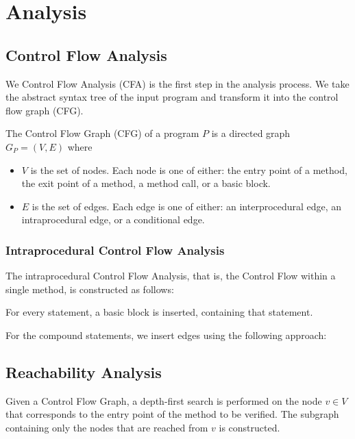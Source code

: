 \section{Analysis}

\subsection{Control Flow Analysis}
We Control Flow Analysis (CFA) is the first step in the analysis process. We 
take the abstract syntax tree of the input program and transform it into the 
control flow graph (CFG).

\begin{definition}
The Control Flow Graph (CFG) of a program $P$ is a directed graph $G_P=(V,E)$
where

\begin{itemize}
    \item $V$ is the set of nodes. Each node is one of either: the entry point 
    of a method, the exit point of a method, a method call, or a basic block.

    \item $E$ is the set of edges. Each edge is one of either: an interprocedural
    edge, an intraprocedural edge, or a conditional edge.
\end{itemize}
\end{definition}

\subsubsection{Intraprocedural Control Flow Analysis}
The intraprocedural Control Flow Analysis, that is, the Control Flow within a
single method, is constructed as follows:

For every statement, a basic block is inserted, containing that statement.

For the compound statements, we insert edges using the following approach:

\begin{description}
    \item[]
    \item[] 
    \item[] 
\end{description}


\subsection{Reachability Analysis}
Given a Control Flow Graph, a depth-first search is performed on the node $v \in V$ 
that corresponds to the entry point of the method to be verified. The subgraph 
containing only the nodes that are reached from $v$ is constructed.